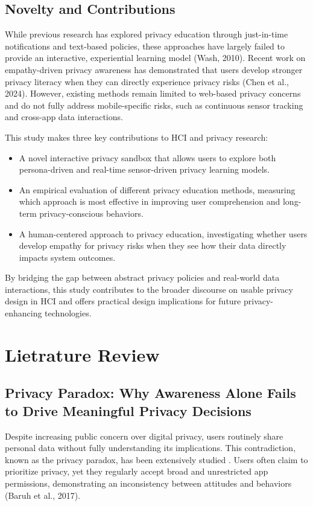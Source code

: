 \documentclass[acmlarge, nonacm]{acmart}
\begin{document}
\subsection{Novelty and Contributions}

While previous research has explored privacy education through just-in-time notifications and text-based policies, these approaches have largely failed to provide an interactive, experiential learning model (Wash, 2010). Recent work on empathy-driven privacy awareness has demonstrated that users develop stronger privacy literacy when they can directly experience privacy risks (Chen et al., 2024). However, existing methods remain limited to web-based privacy concerns and do not fully address mobile-specific risks, such as continuous sensor tracking and cross-app data interactions.

This study makes three key contributions to HCI and privacy research:
\begin{itemize}
    \item A novel interactive privacy sandbox that allows users to explore both persona-driven and real-time sensor-driven privacy learning models.
    \item An empirical evaluation of different privacy education methods, measuring which approach is most effective in improving user comprehension and long-term privacy-conscious behaviors.
    \item A human-centered approach to privacy education, investigating whether users develop empathy for privacy risks when they see how their data directly impacts system outcomes.
\end{itemize}

By bridging the gap between abstract privacy policies and real-world data interactions, this study contributes to the broader discourse on usable privacy design in HCI and offers practical design implications for future privacy-enhancing technologies.

\section{Lietrature Review}

\subsection{Privacy Paradox: Why Awareness Alone Fails to Drive Meaningful Privacy Decisions}

Despite increasing public concern over digital privacy, users routinely share personal data without fully understanding its implications. This contradiction, known as the privacy paradox, has been extensively studied \cite{Gerber2018Explaining}. Users often claim to prioritize privacy, yet they regularly accept broad and unrestricted app permissions, demonstrating an inconsistency between attitudes and behaviors (Baruh et al., 2017).
\end{document}
